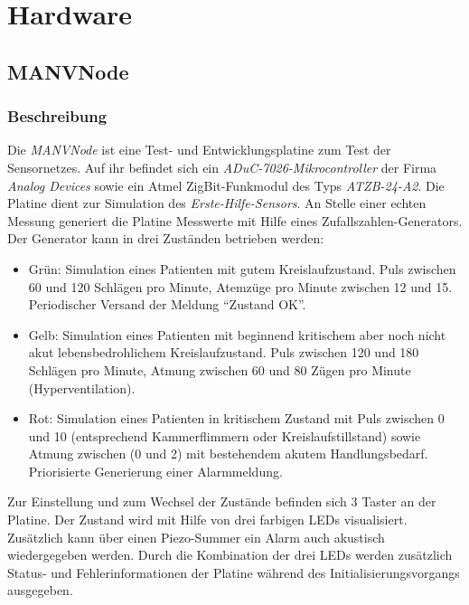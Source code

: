 \section{Hardware}
\subsection{MANVNode}
\subsubsection{Beschreibung}
Die \emph{MANVNode} ist eine Test- und Entwicklungsplatine zum Test der Sensornetzes. Auf ihr befindet sich ein 
\emph{ADuC-7026-Mikrocontroller} der Firma \emph{Analog Devices} sowie ein Atmel ZigBit-Funkmodul des Typs \emph{ATZB-24-A2}. 
Die Platine dient zur Simulation des \emph{Erste-Hilfe-Sensors}. An Stelle einer echten Messung generiert die 
Platine Messwerte mit Hilfe eines Zufallszahlen-Generators. Der Generator kann in drei Zuständen betrieben werden:

\begin{itemize}
    \item{Grün:} Simulation eines Patienten mit gutem Kreislaufzustand. Puls zwischen 60 und 120 Schlägen pro Minute, 
                 Atemzüge pro Minute zwischen 12 und 15. Periodischer Versand der Meldung "`Zustand OK"'.
    \item{Gelb:} Simulation eines Patienten mit beginnend kritischem aber noch nicht akut lebensbedrohlichem 
                 Kreislaufzustand. Puls zwischen 120 und 180 Schlägen pro Minute, Atmung zwischen 60 und 80
                 Zügen pro Minute (Hyperventilation).
    \item{Rot:}  Simulation eines Patienten in kritischem Zustand mit Puls zwischen 0 und 10 (entsprechend
                 Kammerflimmern oder Kreislaufstillstand) sowie Atmung zwischen (0 und 2) mit bestehendem
                 akutem Handlungsbedarf. Priorisierte Generierung einer Alarmmeldung.
\end{itemize}

Zur Einstellung und zum Wechsel der Zustände befinden sich 3 Taster an der Platine. Der Zustand wird mit Hilfe von
drei farbigen LEDs visualisiert. Zusätzlich kann über einen Piezo-Summer ein Alarm auch akustisch wiedergegeben werden.
Durch die Kombination der drei LEDs werden zusätzlich Status- und Fehlerinformationen der Platine während des 
Initialisierungsvorgangs ausgegeben.


